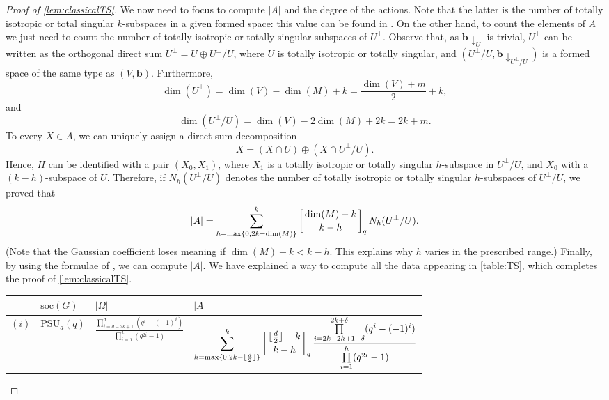\documentclass[a4paper]{amsart}
\theoremstyle{definition}
\begin{document}
\begin{proof}[Proof of \cref{lem:classicalTS}]
    We now need to focus to compute $|A|$ and the degree of the actions. Note that the latter is the number of totally isotropic or total singular $k$-subspaces in a given formed space: this value can be found in \cite[Table~4.1.2]{BurnessGiudici2016}. On the other hand, to count the elements of $A$ we just need to count the number of totally isotropic or totally singular subspaces of $U^\perp$. Observe that, as $\mathbf{b}\downarrow_U$ is trivial, $U^\perp$ can be written as the orthogonal direct sum $U^\perp = U \oplus U^\perp/U$, where $U$ is totally isotropic or totally singular, and $(U^\perp/U, \mathbf{b}\downarrow_{U^\perp/U})$ is a formed space of the same type as $(V, \mathbf{b})$. Furthermore,
    \[\dim(U^\perp) = \dim(V) - \dim(M) + k = \frac{\dim(V)+m}{2} + k, \]
    and
    \[\dim(U^\perp/U) = \dim(V) - 2 \dim(M) + 2k = 2k + m .\]
    To every $X \in A$, we can uniquely assign a direct sum decomposition
    \[ X = \left( X \cap U \right) \oplus \left( X \cap U^\perp/U \right) .\]
    Hence, $H$ can be identified with a pair $(X_0,X_1)$, where $X_1$ is a totally isotropic or totally singular $h$-subspace in $U^\perp/U$, and $X_0$ with a $(k-h)$-subspace of $U$. Therefore, if $N_h(U^\perp/U)$ denotes the number of totally isotropic or totally singular $h$-subspaces of $U^\perp/U$, we proved that
    \[ |A| = \sum_{h=\max\{0, 2k-\dim(M)\}}^{k} \left[ \dim(M)-k \atop k-h \right]_q N_h(U^\perp/U) .\]
    (Note that the Gaussian coefficient loses meaning if $\dim(M)-k < k-h$. This explains why $h$ varies in the prescribed range.) 
    Finally, by using the formulae of \cite[Table~4.1.2]{BurnessGiudici2016}, we can compute $|A|$. We have explained a way to compute all the data appearing in \cref{table:TS}, which completes the proof of \cref{lem:classicalTS}. \hfill \qedhere

{\small
    \begin{table}
	\centering
	\centering
	\begin{tabularx}{\textwidth}{l l X X}
		\toprule
        & $\mathrm{soc}(G)$ & $|\Omega|$ & $|A|$ %
        \\
		
		\midrule
        $(i)$ & $\mathrm{PSU}_d(q)$ & $\displaystyle \frac{\prod\limits_{i = d-2k+1}^{d}(q^i - (-1)^i)}{\prod\limits_{i = 1}^k (q^{2i}-1)}$ & $\displaystyle \sum\limits_{h=\max\{0, 2k - \lfloor \frac{d}{2} \rfloor\}}^{k} \left[ \lfloor \frac{d}{2} \rfloor - k \atop k-h \right]_q
        \frac{\prod\limits_{i = 2k - 2h + 1 + \delta}^{2k + \delta }(q^i - (-1)^i)}{\prod\limits_{i = 1}^h (q^{2i}-1)}$
        \\
        

\end{tabularx}
\end{table}}
\end{proof}
\end{document}
